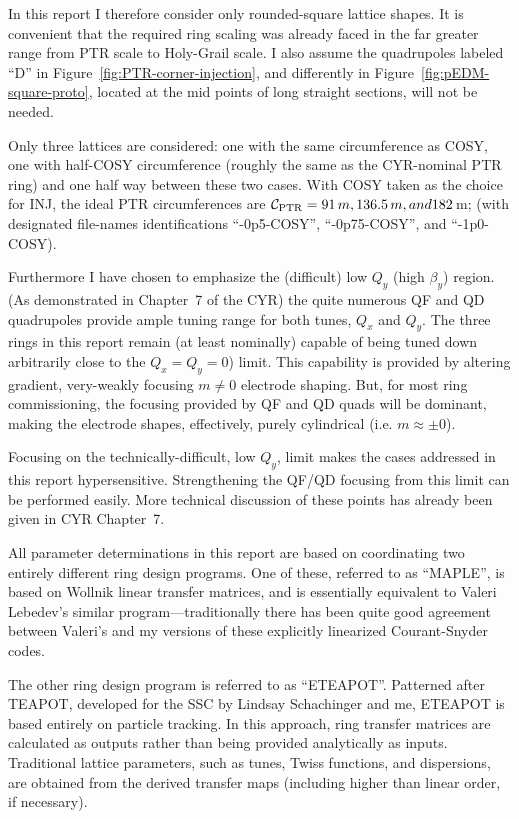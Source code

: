 \documentclass[]{article}
\begin{document}
In this report I therefore consider only rounded-square lattice shapes. It is 
convenient that the required ring scaling was already faced in the far greater
range from PTR scale to Holy-Grail scale. I also assume the quadrupoles labeled ``D''
in Figure~\ref{fig:PTR-corner-injection}, and differently in Figure~\ref{fig:pEDM-square-proto},
located at the mid points of long straight sections, will not be needed.

Only three lattices are considered: one with the same circumference as COSY, one
with half-COSY circumference (roughly the same as the CYR-nominal PTR ring) and
one half way between these two cases.
With COSY taken as the choice for INJ, the ideal PTR
circumferences are $\mathcal{C}_{\rm PTR}= 91\,m, 136.5\,m, and 182$\,m;
(with designated file-names identifications
``-0p5-COSY'', ``-0p75-COSY'', and ``-1p0-COSY). 

Furthermore I have chosen to emphasize the (difficult)
low $Q_y$ (high $\beta_y$) region. (As demonstrated in Chapter~7 of the CYR) 
the quite numerous QF and QD quadrupoles provide ample tuning range for both
tunes, $Q_x$ and $Q_y$. The three rings in this report remain (at least nominally)
capable of being tuned down arbitrarily close to the $Q_x=Q_y=0$) limit.  This capability is
provided by altering gradient, very-weakly focusing $m \neq 0$ electrode shaping.  
But, for most ring commissioning, the focusing provided by QF and QD quads will be dominant,
making the electrode shapes, effectively, purely cylindrical (i.e. $m\approx\pm0$).

Focusing on the technically-difficult, low $Q_y$, limit makes the cases addressed
in this report hypersensitive. Strengthening the QF/QD focusing from this limit
can be performed easily.  More technical discussion of these points has already been
given in CYR Chapter~7.

All parameter determinations in this report are based on coordinating two 
entirely different ring design programs. One of these, referred to as ``MAPLE'', is based on 
Wollnik linear transfer matrices, and is essentially equivalent to Valeri Lebedev's similar
program\cite{Lebedev}---traditionally there has been quite good agreement between 
Valeri's and my versions of these explicitly linearized Courant-Snyder codes. 

The other ring design program is referred to as 
``ETEAPOT''\cite{BNL-Electic-Analogue}\cite{ETEAPOT}. Patterned after
TEAPOT\cite{TEAPOT}\cite{TEAPOT2}\cite{TEAPOT3}, developed for the SSC
by Lindsay Schachinger and me, ETEAPOT is based entirely on particle tracking. 
In this approach, ring transfer matrices are calculated 
as outputs rather than being provided analytically as inputs. Traditional lattice parameters, 
such as tunes, Twiss functions, and dispersions, are obtained from the derived transfer maps 
(including higher than linear order, if necessary).
\end{document}
